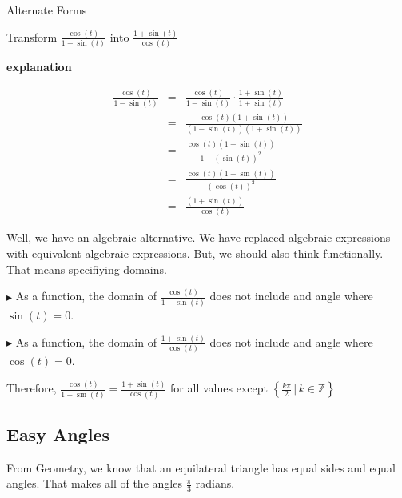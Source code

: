 \documentclass{ximera}
\begin{document}
\begin{example} Alternate Forms


Transform $\frac{\cos(t)}{1 - \sin(t)}$ into $\frac{1 + \sin(t)}{\cos(t)}$



\textbf{\textcolor{red!75!green}{explanation}} 

\begin{align*}
\frac{\cos(t)}{1 - \sin(t)}  &  = &  \frac{\cos(t)}{1 - \sin(t)}  \cdot \frac{1 + \sin(t)}{1 + \sin(t)}  \\
                           &  = &  \frac{\cos(t)(1 + \sin(t))}{(1 - \sin(t))(1 + \sin(t))}  \\
                           &  = &  \frac{\cos(t)(1 + \sin(t))}{1 - (\sin(t))^2}  \\
                           &  = &  \frac{\cos(t)(1 + \sin(t))}{(\cos(t))^2}  \\
                           &  = &  \frac{(1 + \sin(t))}{\cos(t)}  
\end{align*}






Well, we have an algebraic alternative.  We have replaced algebraic expressions with equivalent algebraic expressions.  But, we should also think functionally.  That means specifiying domains.  


$\blacktriangleright$ As a function, the domain of $\frac{\cos(t)}{1 - \sin(t)}$ does not include and angle where $\sin(t) = 0$. 

$\blacktriangleright$ As a function, the domain of $\frac{1 + \sin(t)}{\cos(t)}$ does not include and angle where $\cos(t) = 0$. 



Therefore, $\frac{\cos(t)}{1 - \sin(t)} = \frac{1 + \sin(t)}{\cos(t)}$ for all values except $\left\{   \frac{k \pi}{2} \, | \, k \in \mathbb{Z}      \right\}$

\end{example}










\subsection*{Easy Angles}


From Geometry, we know that an equilateral triangle has equal sides and equal angles.  That makes all of the angles $\frac{\pi}{3}$ radians.  
\end{document}
